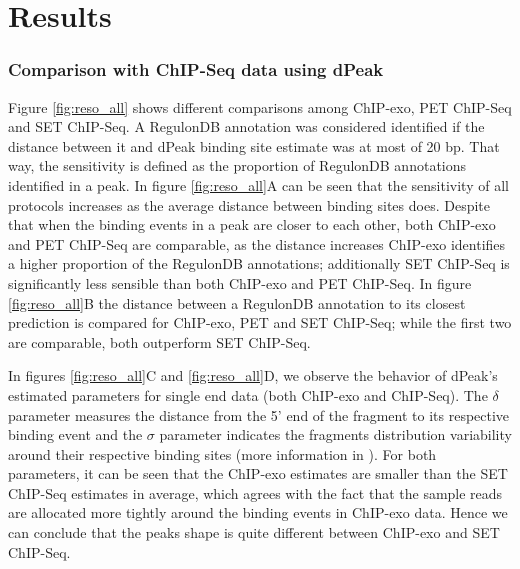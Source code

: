 \documentclass[11pt]{article}\usepackage[]{graphicx}\usepackage[]{color}
\begin{document}
\section{Results}
\label{sec:results}


\subsubsection{Comparison with ChIP-Seq data using dPeak}
\label{sec:dpeak_analysis}




Figure \ref{fig:reso_all} shows different comparisons among ChIP-exo,
PET ChIP-Seq and SET ChIP-Seq. A RegulonDB annotation was considered
identified if the distance between it and dPeak binding site estimate
was at most of 20 bp. That way, the sensitivity is defined as
the proportion of RegulonDB annotations identified in a peak. In
figure \ref{fig:reso_all}A can be seen that the sensitivity of all
protocols increases as the average distance between binding sites
does. Despite that when the binding events in a peak are closer to
each other, both ChIP-exo and PET ChIP-Seq are comparable, as the
distance increases ChIP-exo identifies a higher proportion of the
RegulonDB annotations; additionally SET ChIP-Seq is significantly less
sensible than both ChIP-exo and PET ChIP-Seq. In figure
\ref{fig:reso_all}B the distance between a RegulonDB annotation to its
closest prediction is compared for ChIP-exo, PET and SET ChIP-Seq;
while the first two are comparable, both outperform SET ChIP-Seq.

In figures \ref{fig:reso_all}C and \ref{fig:reso_all}D, we observe the
behavior of dPeak's estimated parameters for single end data (both
ChIP-exo and ChIP-Seq). The $\delta$ parameter measures the distance
from the 5' end of the fragment to its respective binding event and
the $\sigma$ parameter indicates the fragments distribution
variability around their respective binding sites (more information in
\cite{dpeak}). For both parameters, it can be seen that the ChIP-exo
estimates are smaller than the SET ChIP-Seq estimates in average,
which agrees with the fact that the sample reads are allocated more
tightly around the binding events in ChIP-exo data. Hence we can
conclude that the peaks shape is quite different between ChIP-exo and
SET ChIP-Seq.
\end{document}
